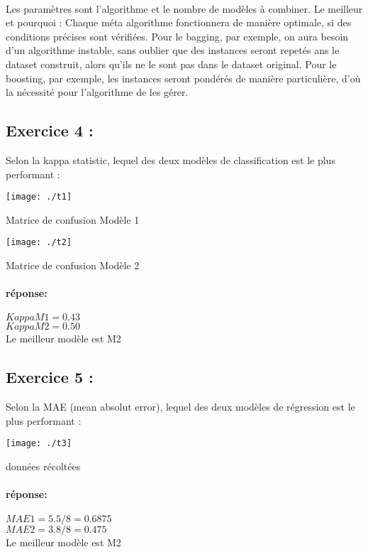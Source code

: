 \documentclass[a4paper, 12pt]{article}
\begin{document}
	\paragraph{}Les paramètres sont l’algorithme et le nombre de modèles à combiner. Le meilleur et pourquoi : Chaque méta algorithme fonctionnera de manière optimale, si des conditions précises sont vérifiées. Pour le bagging, par exemple, on aura besoin d’un algorithme instable, sans oublier que des instances seront repetés ans le dataset construit, alors qu’ils ne le sont pas dans le dataset original. Pour le boosting, par exemple, les instances seront pondérés de manière particulière, d’où la nécessité pour l’algorithme de les gérer.
	
	\subsection*{Exercice 4 :   } \justifying Selon la kappa statistic, lequel des deux modèles de classification est le plus performant : 
	\begin{table}[h]
		\centering
		\texttt{[image: ./t1]}
		\caption{Matrice de confusion Modèle 1}
	\end{table}
	\begin{table}[h]
		\centering
		\texttt{[image: ./t2]}
		\caption{Matrice de confusion Modèle 2}
	\end{table}
	\paragraph{réponse: } $Kappa M1 = 0.43$ \\       $Kappa M2 = 0.50$\\ Le meilleur modèle est M2
	\newpage
	
	\subsection*{Exercice 5 :} \justifying Selon la MAE (mean absolut error), lequel des deux modèles de régression est le plus performant :
	\begin{table}[h]
		\centering
		\texttt{[image: ./t3]}
		\caption{données récoltées}
	\end{table}
	\paragraph{réponse: } $MAE1 = 5.5/8 = 0.6875$ \\       $MAE2 = 3.8/8 = 0.475$\\ Le meilleur modèle est M2
	
	
\end{document}
